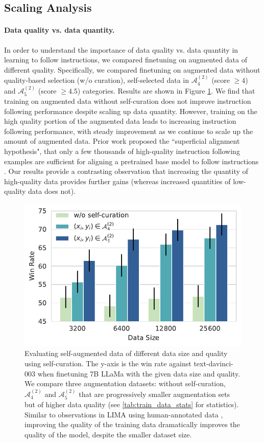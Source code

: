 \subsection{Scaling Analysis} \label{sec:scaling_analysis}
\paragraph{Data quality vs. data quantity.} In order to understand the importance of data quality vs. data quantity in learning to follow instructions, we compared finetuning on augmented data of different quality. Specifically, we compared finetuning on augmented data without quality-based selection (w/o curation), self-selected data in $\mathcal{A}_{4}^{(2)}$ (score $\geq 4$) and $\mathcal{A}_{5}^{(2)}$ (score $\geq 4.5$) categories. Results are shown  in Figure \ref{fig:data_quality_scaling}. We find that training on augmented data without self-curation does not improve instruction following performance despite scaling up data quantity. However,  training on the high quality portion of the augmented data leads to increasing instruction following performance, with steady improvement as we continue to scale up the amount of augmented data. Prior work proposed the ``superficial alignment hypothesis", that only a few thousands of high-quality instruction following examples are sufficient for aligning a pretrained base model to follow instructions \cite{zhou2023lima}. Our results provide a contrasting observation that increasing the quantity of high-quality data provides  further gains (whereas increased quantities of low-quality data does not). 


\begin{figure}
  \centering
  \includegraphics[width=0.55\columnwidth]{figs/data_scaling_quality.pdf}
  \caption{Evaluating self-augmented data of different data size and quality using self-curation. The y-axis is the win rate against text-davinci-003 when finetuning 7B LLaMa with the given data size and quality. We compare three augmentation datasets:  without self-curation,  $\mathcal{A}_{4}^{(2)}$ and  $\mathcal{A}_{5}^{(2)}$ that are progressively smaller augmentation sets but of higher data quality 
  (see \autoref{tab:train_data_stats}
  for statistics).
  Similar to observations in LIMA using human-annotated data \citep{zhou2023lima}, improving the quality of the training data dramatically improves the quality of the model, despite the smaller dataset size. }
  \label{fig:data_quality_scaling}
\end{figure}

